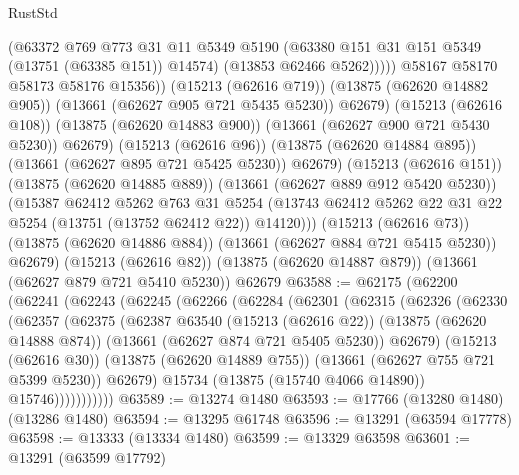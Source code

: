 \begin{lexlean}{RustStd}
\begin{coremodule}
                        (@63372
                          @769
                          @773
                          @31
                          @11
                          @5349
                          @5190
                          (@63380 @151 @31 @151 @5349 (@13751 (@63385 @151)) @14574)
                          (@13853 @62466 @5262)))))
                  @58167
                  @58170
                  @58173
                  @58176
                  @15356))
              (@15213 (@62616 @719))
              (@13875 (@62620 @14882 @905))
              (@13661 (@62627 @905 @721 @5435 @5230))
              @62679)
            (@15213 (@62616 @108))
            (@13875 (@62620 @14883 @900))
            (@13661 (@62627 @900 @721 @5430 @5230))
            @62679)
          (@15213 (@62616 @96))
          (@13875 (@62620 @14884 @895))
          (@13661 (@62627 @895 @721 @5425 @5230))
          @62679)
        (@15213 (@62616 @151))
        (@13875 (@62620 @14885 @889))
        (@13661 (@62627 @889 @912 @5420 @5230))
        (@15387
          @62412
          @5262
          @763
          @31
          @5254
          (@13743 @62412 @5262 @22 @31 @22 @5254 (@13751 (@13752 @62412 @22)) @14120)))
      (@15213 (@62616 @73))
      (@13875 (@62620 @14886 @884))
      (@13661 (@62627 @884 @721 @5415 @5230))
      @62679)
    (@15213 (@62616 @82))
    (@13875 (@62620 @14887 @879))
    (@13661 (@62627 @879 @721 @5410 @5230))
    @62679
@63588 := @62175
    (@62200
      (@62241
        (@62243
          (@62245
            (@62266
              (@62284
                (@62301
                  (@62315
                    (@62326
                      (@62330
                        (@62357
                          (@62375
                            (@62387
                              @63540
                              (@15213 (@62616 @22))
                              (@13875 (@62620 @14888 @874))
                              (@13661 (@62627 @874 @721 @5405 @5230))
                              @62679)
                            (@15213 (@62616 @30))
                            (@13875 (@62620 @14889 @755))
                            (@13661 (@62627 @755 @721 @5399 @5230))
                            @62679)
                          @15734
                          (@13875 (@15740 @4066 @14890))
                          @15746)))))))))))
@63589 := @13274 @1480
@63593 := @17766 (@13280 @1480) (@13286 @1480)
@63594 := @13295 @61748
@63596 := @13291 (@63594 @17778)
@63598 := @13333 (@13334 @1480)
@63599 := @13329 @63598
@63601 := @13291 (@63599 @17792)

\end{coremodule}
\end{lexlean}
